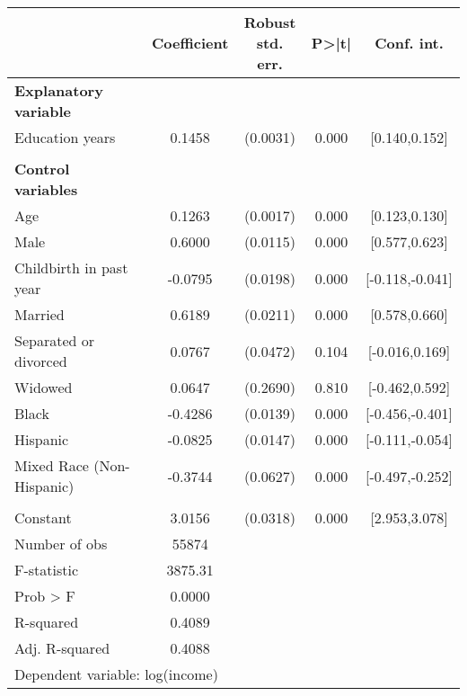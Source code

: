 {
\def\sym#1{\ifmmode^{#1}\else\(^{#1}\)\fi}
\begin{tabular}{l*{1}{cccc}}
\toprule
                    & Coefficient&\shortstack{Robust\\std. err.}&       P>|t|&  Conf. int.\\
\midrule
\textbf{Explanatory variable}&            &            &            &            \\
Education years     &      0.1458&    (0.0031)&       0.000&[0.140,0.152]\\
\\ \textbf{Control variables}&            &            &            &            \\
Age                 &      0.1263&    (0.0017)&       0.000&[0.123,0.130]\\
Male                &      0.6000&    (0.0115)&       0.000&[0.577,0.623]\\
Childbirth in past year&     -0.0795&    (0.0198)&       0.000&[-0.118,-0.041]\\
Married             &      0.6189&    (0.0211)&       0.000&[0.578,0.660]\\
Separated or divorced&      0.0767&    (0.0472)&       0.104&[-0.016,0.169]\\
Widowed             &      0.0647&    (0.2690)&       0.810&[-0.462,0.592]\\
Black               &     -0.4286&    (0.0139)&       0.000&[-0.456,-0.401]\\
Hispanic            &     -0.0825&    (0.0147)&       0.000&[-0.111,-0.054]\\
Mixed Race (Non-Hispanic)&     -0.3744&    (0.0627)&       0.000&[-0.497,-0.252]\\
                    &            &            &            &            \\
Constant            &      3.0156&    (0.0318)&       0.000&[2.953,3.078]\\
\midrule
Number of obs       &       55874&            &            &            \\
F-statistic         &     3875.31&            &            &            \\
Prob > F            &      0.0000&            &            &            \\
R-squared           &      0.4089&            &            &            \\
Adj. R-squared      &      0.4088&            &            &            \\
\bottomrule
\multicolumn{5}{l}{\footnotesize Dependent variable: log(income)}\\
\end{tabular}
}
